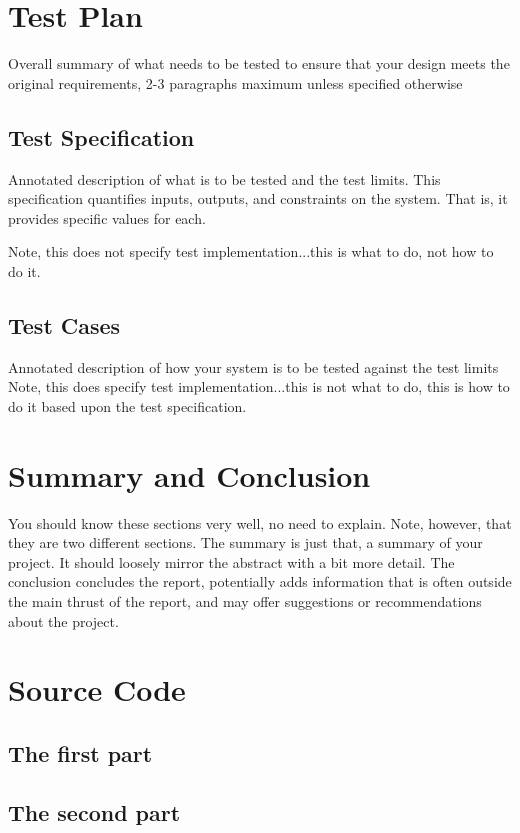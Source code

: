 \documentclass[12pt]{article} %
\begin{document}
\section{Test Plan}

Overall summary of what needs to be tested to ensure that your design meets the original requirements, 2-3 paragraphs maximum unless specified otherwise

\subsection{Test Specification}

Annotated description of what is to be tested and the test limits.  This specification quantifies inputs, outputs, and constraints on the system.  That is, it provides specific values for each. 

Note, this does not specify test implementation...this is what to do, not how to do it.

\subsection{Test Cases}

Annotated description of how your system is to be tested against the test limits
Note, this does specify test implementation...this is not what to do, this is how to do it based upon the test specification.

\section{Summary and Conclusion}

You should know these sections very well, no need to explain.  Note, however, that they are two different sections.  The summary is just that, a summary of your project.  It should loosely mirror the abstract with a bit more detail.  The conclusion concludes the report, potentially adds information that is often outside the main thrust of the report, and may offer suggestions or recommendations about the project.

\pagebreak
\appendix

\section{Source Code}
\subsection{The first part}


\subsection{The second part}

\end{document}
